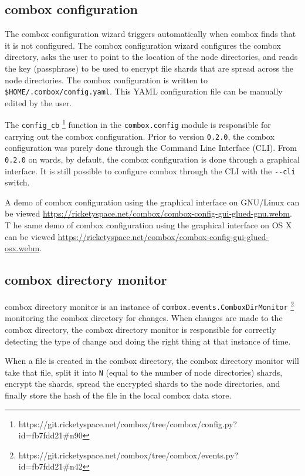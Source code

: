 \subsection{combox configuration}\label{sec:3-combox-config}

The combox configuration wizard triggers automatically when combox
finds that it is not configured. The combox configuration wizard
configures the combox directory, asks the user to point to the
location of the node directories, and reads the key (passphrase) to be
used to encrypt file shards that are spread across the node
directories. The combox configuration is written to
\verb+$HOME/.combox/config.yaml+. This YAML configuration file can be
manually edited by the user.

The \verb+config_cb+
\footnote{https://git.ricketyspace.net/combox/tree/combox/config.py?id=fb7fdd21\#n90}
function in the \verb+combox.config+ module is responsible for
carrying out the combox configuration. Prior to version \verb+0.2.0+,
the combox configuration was purely done through the Command Line
Interface (CLI). From \verb+0.2.0+ on wards, by default, the combox
configuration is done through a graphical interface. It is still
possible to configure combox through the CLI with the \verb+--cli+
switch.

A demo of combox configuration using the graphical interface on
GNU/Linux can be viewed
\url{https://ricketyspace.net/combox/combox-config-gui-glued-gnu.webm}.
T he same demo of combox configuration using the graphical interface
on OS X can be viewed
\url{https://ricketyspace.net/combox/combox-config-gui-glued-osx.webm}.

\subsection{combox directory monitor}\label{sec:3-combox-cdirm}

combox directory monitor is an instance of
\verb+combox.events.ComboxDirMonitor+
\footnote{https://git.ricketyspace.net/combox/tree/combox/events.py?id=fb7fdd21\#n42}
monitoring the combox directory for changes. When changes are made to
the combox directory, the combox directory monitor is responsible for
correctly detecting the type of change and doing the right thing at
that instance of time.

When a file is created in the combox directory, the combox directory
monitor will take that file, split it into \verb+N+ (equal to the
number of node directories) shards, encrypt the shards, spread the
encrypted shards to the node directories, and finally store the hash
of the file in the local combox data store.

